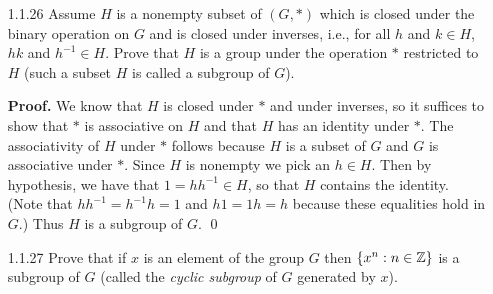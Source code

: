 \begin{enumerate}
      \textbf{Proof.} Let $G$ be a group. Suppose that $x^2 = 1$ for all
      $x \in G$. We want to show that $G$ is abelian; that is, we want to show 
      that $xy = yx$ for all $x, y \in G$. So let $x, y \in G$. By hypothesis, 
      we have that $x^2 = e$, $y^2 = e$, and $(xy)^2 = e$, so that according to 
      Proposition 2, we must have that $x = x^{-1}$, $y = y^{-1}$, and
      $xy = (xy)^{-1}$. Thus
      \begin{align*}
         xy &= (xy)^{-1}      &[\text{By Hypothesis}] \\
            &= y^{-1}x^{-1}   &[\text{Proposition 1}] \\
            &= yx.
      \end{align*}
      Thus $G$ is abelian. \qed
   \item[1.1.26]  Assume $H$ is a nonempty subset of $(G, *)$ which is closed 
                  under the binary operation on $G$ and is closed under
                  inverses, i.e., for all $h$ and
                  $k \in H$, $hk$ and $h^{-1} \in H$. Prove that $H$ is a group 
                  under the operation $*$ restricted to $H$ (such a subset $H$
                  is called a subgroup of $G$).

      \textbf{Proof.} We know that $H$ is closed under $*$ and under inverses, 
      so it suffices to show that $*$ is associative on $H$ and that $H$ has an 
      identity under $*$. The associativity of $H$ under $*$ follows because $H$ 
      is a subset of $G$ and $G$ is associative under $*$. Since $H$ is nonempty
      we pick an $h \in H$. Then by hypothesis, we have that
      $1 = hh^{-1} \in H$, so that $H$ contains the identity. (Note that
      $hh^{-1} = h^{-1}h = 1$ and $h1 = 1h = h$ because these equalities hold in
      $G$.) Thus $H$ is a subgroup of $G$. \qed
   \item[1.1.27]  Prove that if $x$ is an element of the group $G$ then
                  $\{x^n : n \in \mathbb{Z}\}$ is a subgroup of $G$ (called the
                  \textit{cyclic subgroup} of $G$ generated by $x$).


\end{enumerate}
